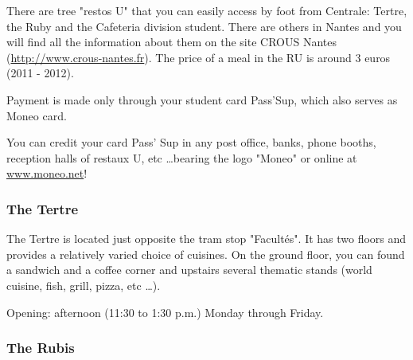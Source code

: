 
There are tree "restos U" that you can easily access by foot from Centrale: Tertre, the Ruby and the Cafeteria division student. There are others in Nantes and you will find all the information about them on the site CROUS Nantes (\url{http://www.crous-nantes.fr}). The price of a meal in the RU is around 3 euros (2011 - 2012).

Payment is made only through your student card Pass'Sup, which also serves as Moneo card.

You can credit your card Pass' Sup in any post office, banks, phone booths, reception halls of restaux U, etc \dots bearing the logo "Moneo" or online at \url{www.moneo.net}!

\subsubsection{The Tertre}


The Tertre is located just opposite the tram stop "Facultés". It has two floors and provides a relatively varied choice of cuisines.
On the ground floor, you can found a sandwich and a coffee corner and upstairs several thematic stands (world cuisine, fish, grill, pizza, etc \dots).

Opening: afternoon (11:30 to 1:30 p.m.) Monday through Friday.
\subsubsection{The Rubis}


